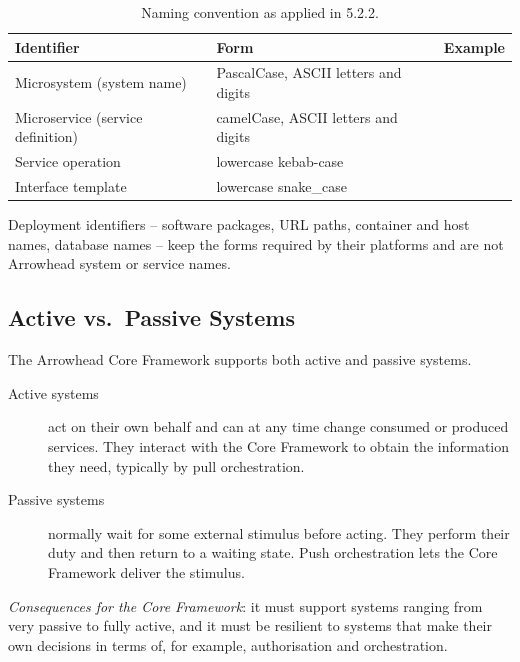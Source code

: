 \documentclass[a4paper]{arrowhead}
\begin{document}
\begin{table}[h!]
\centering\footnotesize
\begin{tabularx}{\textwidth}{|P{4.4cm}|P{4.6cm}|Y|}\hline
{}Identifier & Form & Example \\\hline
Microsystem (system name) & PascalCase, ASCII letters and digits &  \\\hline
Microservice (service definition) & camelCase, ASCII letters and digits &  \\\hline
Service operation & lowercase kebab-case &  \\\hline
Interface template & lowercase snake\_case &  \\\hline
\end{tabularx}
\caption{Naming convention as applied in 5.2.2.}
\label{tab:naming}
\end{table}

Deployment identifiers -- software packages, URL paths, container and host names, database names
-- keep the forms required by their platforms and are not Arrowhead system or service names.

\subsection{Active vs.\ Passive Systems}
The Arrowhead Core Framework supports both active and passive systems.
\begin{description}
  \item[Active systems] act on their own behalf and can at any time change consumed or produced
        services. They interact with the Core Framework to obtain the information they need,
        typically by pull orchestration.
  \item[Passive systems] normally wait for some external stimulus before acting. They perform
        their duty and then return to a waiting state. Push orchestration lets the Core Framework
        deliver the stimulus.
\end{description}
\emph{Consequences for the Core Framework}: it must support systems ranging from very passive to
fully active, and it must be resilient to systems that make their own decisions in terms of,
for example, authorisation and orchestration.
\end{document}
